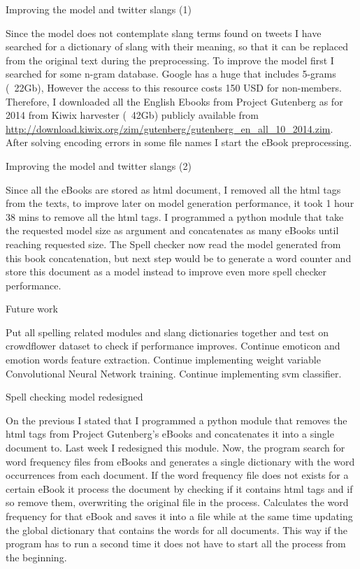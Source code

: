 Improving the model and twitter slangs (1)

Since the model does not contemplate slang terms found on tweets I have searched for a dictionary of slang with their meaning, so that it can be replaced from the original text during the preprocessing.
To improve the model first I searched for some n-gram database. Google has a huge that includes 5-grams (~22Gb), However the access to this resource costs 150 USD for non-members\cite{LDCGoogle5-gram}. Therefore, I downloaded all the English Ebooks from Project Gutenberg as for 2014 from Kiwix harvester\cite{kiwix} (~42Gb) publicly available from \url{http://download.kiwix.org/zim/gutenberg/gutenberg_en_all_10_2014.zim}. After solving encoding errors in some file names I start the eBook preprocessing.

Improving the model and twitter slangs (2)

Since all the eBooks are stored as \acrfull{html} document, I removed all the \acrshort{html} tags from the texts, to improve later on model generation performance, it took 1 hour 38 mins to remove all the \acrshort{html} tags.
I programmed a python module that take the requested model size as argument and concatenates as many eBooks until reaching requested size.
The Spell checker now read the model generated from this book concatenation, but next step would be to generate a word counter and store this document as a model instead to improve even more spell checker performance.

Future work

Put all spelling related modules and slang dictionaries together and test on crowdflower dataset to check if performance improves.
Continue emoticon and emotion words feature extraction.
Continue implementing weight variable Convolutional Neural Network training.
Continue implementing \acrshort{svm} classifier.

Spell checking model redesigned

On the previous I stated that I programmed a python module that removes the \acrshort{html} tags from Project Gutenberg's eBooks and concatenates it into a single document to. Last week I redesigned this module.
Now, the program search for word frequency files from eBooks and generates a single dictionary with the word occurrences from each document.
If the word frequency file does not exists for a certain eBook it process the document by checking if it contains \acrshort{html} tags and if so remove them, overwriting the original file in the process.
Calculates the word frequency for that eBook and saves it into a file while at the same time updating the global dictionary that contains the words for all documents.
This way if the program has to run a second time it does not have to start all the process from the beginning.

